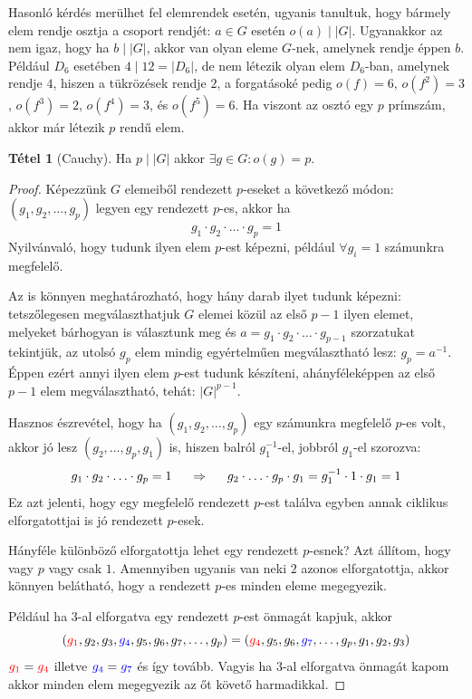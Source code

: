 \documentclass[12pt]{book}
\theoremstyle{plain} %
\theoremstyle{definition} %
\newtheorem{theo/}{Tétel}[section]
\newenvironment{theo}
  {\renewcommand{\qedsymbol}{$\clubsuit$}%
   \pushQED{\qed}\begin{theo/}}
  {\popQED\end{theo/}}
\theoremstyle{remark}
\renewcommand\qedsymbol{$\blacksquare$}
\numberwithin{equation}{section}  %
\begin{document}
	Hasonló kérdés merülhet fel elemrendek esetén, ugyanis tanultuk, hogy bármely elem rendje osztja a csoport rendjét: $a\in G$ esetén $o(a)\mid |G|$. Ugyanakkor az nem igaz, hogy ha $b\mid |G|$, akkor van olyan eleme $G$-nek, amelynek rendje éppen $b$. Például $D_6$ esetében $4\mid 12 = |D_6|$, de nem létezik olyan elem $D_6$-ban, amelynek rendje $4$, hiszen a tükrözések rendje $2$, a forgatásoké pedig $o(f) = 6$, $o(f^2) = 3$, $o(f^3) = 2$, $o(f^4) = 3$, és $o(f^5) = 6$. Ha viszont az osztó egy $p$ prímszám, akkor már létezik $p$ rendű elem.
	
	\begin{theo}[Cauchy]
		Ha $p\mid |G|$ akkor $\exists g\in G\colon o(g) = p$.
	\end{theo}

	\begin{proof}
		Képezzünk $G$ elemeiből rendezett $p$-eseket a következő módon: $(g_1,g_2,\ldots,g_p)$ legyen egy rendezett $p$-es, akkor ha
		\[ g_1 \cdot g_2 \cdot \ldots \cdot g_p = 1  \]
		Nyilvánvaló, hogy tudunk ilyen elem $p$-est képezni, például $\forall g_i = 1$ számunkra megfelelő.
		
		Az is könnyen meghatározható, hogy hány darab ilyet tudunk képezni: tetszőlegesen megválaszthatjuk $G$ elemei közül az első $p-1$ ilyen elemet, melyeket bárhogyan is választunk meg és $a = g_1 \cdot g_2 \cdot \ldots \cdot g_{p-1}$ szorzatukat tekintjük, az utolsó $g_p$ elem mindig egyértelműen megválasztható lesz: $g_p = a^{-1}$. Éppen ezért annyi ilyen elem $p$-est tudunk készíteni, ahányféleképpen az első $p-1$ elem megválasztható, tehát: $|G|^{p-1}$.
		
		Hasznos észrevétel, hogy ha $(g_1,g_2,\ldots, g_p)$ egy számunkra megfelelő $p$-es volt, akkor jó lesz $(g_2,\ldots, g_p, g_1)$ is, hiszen balról $g_1^{-1}$-el, jobbról $g_1$-el szorozva:
		\[ g_1\cdot g_2\cdot \ldots \cdot g_p = 1 \hspace{5mm} \Rightarrow \hspace{5mm} g_2 \cdot \ldots \cdot g_p \cdot g_1 = g_1^{-1} \cdot 1 \cdot g_1 = 1  \]
		Ez azt jelenti, hogy egy megfelelő rendezett $p$-est találva egyben annak ciklikus elforgatottjai is jó rendezett $p$-esek. 
		
		Hányféle különböző elforgatottja lehet egy rendezett $p$-esnek? Azt állítom, hogy vagy $p$ vagy csak $1$. Amennyiben ugyanis van neki $2$ azonos elforgatottja, akkor könnyen belátható, hogy a rendezett $p$-es minden eleme megegyezik.
		
		Például ha $3$-al elforgatva egy rendezett $p$-est önmagát kapjuk, akkor
		\[ (\color{red} g_1 \color{black}, g_2, g_3, \color{blue} g_4 \color{black}, g_5, g_6, g_7, \ldots, g_p) = (\color{red} g_4 \color{black}, g_5, g_6, \color{blue} g_7 \color{black}, \ldots, g_p, g_1, g_2, g_3)  \]
		$\color{red} g_1 \color{black} = \color{red} g_4 \color{black}$ illetve $\color{blue} g_4 \color{black} = \color{blue} g_7 \color{black}$ és így tovább. Vagyis ha $3$-al elforgatva önmagát kapom akkor minden elem megegyezik az őt követő harmadikkal.
		

\end{proof}
\end{document}
